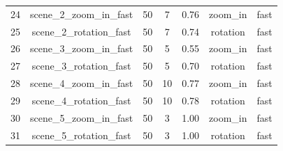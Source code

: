 \begin{table}
\begin{tabular}{|c|c|c|c|c|c|c|}
24 & scene\_2\_zoom\_in\_fast & 50                                                       & 7                                                         & 0.76                                                         & zoom\_in                                                    & fast     \\
25 & scene\_2\_rotation\_fast & 50                                                       & 7                                                         & 0.74                                                         & rotation                                                    & fast     \\
26 & scene\_3\_zoom\_in\_fast & 50                                                       & 5                                                         & 0.55                                                         & zoom\_in                                                    & fast     \\
27 & scene\_3\_rotation\_fast & 50                                                       & 5                                                         & 0.70                                                         & rotation                                                    & fast     \\
28 & scene\_4\_zoom\_in\_fast & 50                                                       & 10                                                        & 0.77                                                         & zoom\_in                                                    & fast     \\
29 & scene\_4\_rotation\_fast & 50                                                       & 10                                                        & 0.78                                                         & rotation                                                    & fast     \\
30 & scene\_5\_zoom\_in\_fast & 50                                                       & 3                                                         & 1.00                                                         & zoom\_in                                                    & fast     \\
31 & scene\_5\_rotation\_fast & 50                                                       & 3                                                         & 1.00                                                         & rotation                                                    & fast     \\

\end{tabular}
\end{table}
